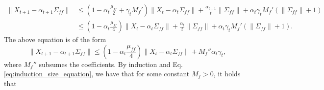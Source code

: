 \begin{align*}
    \lVert X_{t+1} - \alpha_{t+1} \Sigma_{ff}\rVert 
    & \leq \left(1 - \alpha_t \frac{\mu_{ff}}{2} + \gamma_t M_f'\right) \lVert X_t - \alpha_t \Sigma_{ff} \rVert 
    + \frac{\alpha_{t+1}}{t} \lVert \Sigma_{ff} \rVert
    + \alpha_t \gamma_t  M_f' (\lVert \Sigma_{ff}  \rVert + 1)
    \\ 
    & 
    \leq 
    \left(1 - \alpha_t \frac{\mu_{ff}}{4}\right) \lVert X_t - \alpha_t \Sigma_{ff}\rVert 
    + \frac{\alpha_t}{t} \lVert \Sigma_{ff} \rVert + \alpha_t \gamma_t M_f' (\lVert \Sigma_{ff}  \rVert + 1)
    .
\end{align*}
The above equation is of the form
\begin{equation}
    \lVert X_{t+1} - \alpha_{t+1} \Sigma_{ff} \rVert \leq \left(1 - \alpha_t \frac{\mu_{ff}}{4}\right) \lVert X_t - \alpha_t \Sigma_{ff} \rVert
    + M_f'' \alpha_t \gamma_t ,
\end{equation}
where $M_f''$ subsumes the coefficients. 
By induction and Eq. \eqref{eq:induction_size_equation}, we have that for some constant $M_f > 0$, it holds that
